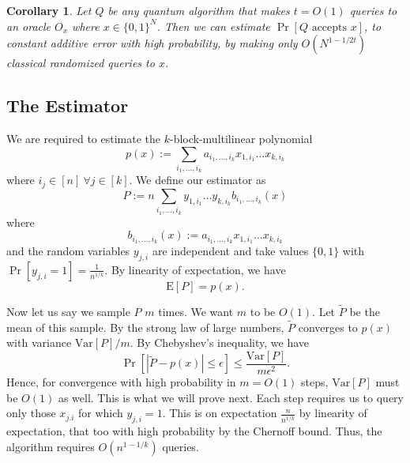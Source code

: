 \documentclass[12pt]{report}
\newtheorem*{corollary}{Corollary}
\newcommand{\Exp}{\mathrm{E}}
\newcommand{\Var}{\mathrm{Var}}
\begin{document}
\begin{corollary}
Let $Q$ be any quantum algorithm that makes $t = O(1)$ queries to an oracle $O_x$ where $x \in \{0,1\}^{N}$. Then we can estimate $\Pr[Q\text{ accepts }x]$, to constant additive error with high probability, by making only $O\left(N^{1 - 1/2t}\right)$ classical randomized queries to $x$.
\end{corollary}

\subsection{The Estimator}
We are required to estimate the $k$-block-multilinear polynomial
\begin{equation}
p(x) := \sum_{i_1, \ldots, i_k} a_{i_1, \ldots, i_k} x_{1,i_1} \ldots x_{k,i_k}
\end{equation}
where $i_j \in [n]\ \forall j \in [k]$. We define our estimator as
\begin{equation}
P := n\sum_{i_1, \ldots, i_k} y_{1,i_1} \ldots y_{k,i_k} b_{i_1, \ldots, i_k}(x)
\end{equation}
where
\begin{equation}
b_{i_1, \ldots, i_k}(x) := a_{i_1, \ldots, i_k} x_{1,i_1} \dots x_{k,i_k}
\end{equation} and the random variables $y_{j,i}$ are independent and take values $\{0,1\}$ with $\Pr[y_{j,i} = 1] = \frac{1}{n^{1/k}}$. By linearity of expectation, we have
\begin{equation}
\Exp[P] = p(x).
\end{equation}

Now let us say we sample $P$ $m$ times. We want $m$ to be $O(1)$. Let $\tilde{P}$ be the mean of this sample. By the strong law of large numbers, $\tilde{P}$ converges to $p(x)$ with variance $\Var[P]/m$. By Chebyshev's inequality, we have
\begin{equation}
\Pr[|\tilde{P} - p(x)| \leq \epsilon] \leq \frac{\Var[P]}{m \epsilon^2}.
\end{equation}
Hence, for convergence with high probability in $m = O(1)$ steps, $\Var[P]$ must be $O(1)$ as well. This is what we will prove next. Each step requires us to query only those $x_{j.i}$ for which $y_{j,i} = 1$. This is on expectation $\frac{n}{n^{1/k}}$ by linearity of expectation, that too with high probability by the Chernoff bound. Thus, the algorithm requires $O(n^{1-1/k})$ queries.
\end{document}

